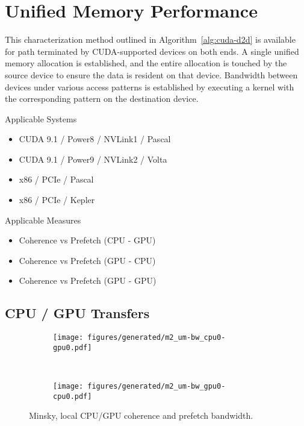\chapter{Unified Memory Performance}
\label{ch:unified-char}

This characterization method outlined in Algorithm~\ref{alg:cuda-d2d} is available for path terminated by CUDA-supported devices on both ends.
A single unified memory allocation is established, and the entire allocation is touched by the source device to ensure the data is resident on that device.
Bandwidth between devices under various access patterns is established by executing a kernel with the corresponding pattern on the destination device.

Applicable Systems
\begin{itemize}
    \item CUDA 9.1 / Power8 / NVLink1 / Pascal
    \item CUDA 9.1 / Power9 / NVLink2 / Volta
    \item x86 / PCIe / Pascal
    \item x86 / PCIe / Kepler
\end{itemize}

Applicable Measures
\begin{itemize}
    \item Coherence vs Prefetch (CPU - GPU)
    \item Coherence vs Prefetch (GPU - CPU)
    \item Coherence vs Prefetch (GPU - GPU)
\end{itemize}



\section{CPU / GPU Transfers}

\begin{figure}[ht]
    \centering
    \begin{subfigure}[b]{0.45\textwidth}
        \texttt{[image: figures/generated/m2\_um-bw\_cpu0-gpu0.pdf]}
        \caption{}
        \label{}
    \end{subfigure}
    ~
    \begin{subfigure}[b]{0.45\textwidth}
        \texttt{[image: figures/generated/m2\_um-bw\_gpu0-cpu0.pdf]}
        \caption{}
        \label{}
    \end{subfigure}
    \caption[]{Minsky, local CPU/GPU coherence and prefetch bandwidth.}
    \label{}
\end{figure}

